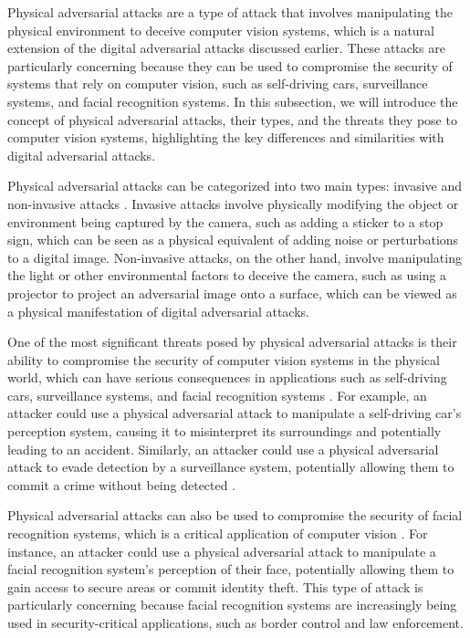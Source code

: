 \documentclass[11pt]{article}
\begin{document}
Physical adversarial attacks are a type of attack that involves manipulating the physical environment to deceive computer vision systems, which is a natural extension of the digital adversarial attacks discussed earlier. These attacks are particularly concerning because they can be used to compromise the security of systems that rely on computer vision, such as self-driving cars, surveillance systems, and facial recognition systems. In this subsection, we will introduce the concept of physical adversarial attacks, their types, and the threats they pose to computer vision systems, highlighting the key differences and similarities with digital adversarial attacks.

Physical adversarial attacks can be categorized into two main types: invasive and non-invasive attacks \cite{ref63}. Invasive attacks involve physically modifying the object or environment being captured by the camera, such as adding a sticker to a stop sign, which can be seen as a physical equivalent of adding noise or perturbations to a digital image. Non-invasive attacks, on the other hand, involve manipulating the light or other environmental factors to deceive the camera, such as using a projector to project an adversarial image onto a surface, which can be viewed as a physical manifestation of digital adversarial attacks.

One of the most significant threats posed by physical adversarial attacks is their ability to compromise the security of computer vision systems in the physical world, which can have serious consequences in applications such as self-driving cars, surveillance systems, and facial recognition systems \cite{ref5}. For example, an attacker could use a physical adversarial attack to manipulate a self-driving car's perception system, causing it to misinterpret its surroundings and potentially leading to an accident. Similarly, an attacker could use a physical adversarial attack to evade detection by a surveillance system, potentially allowing them to commit a crime without being detected \cite{ref11}.

Physical adversarial attacks can also be used to compromise the security of facial recognition systems, which is a critical application of computer vision \cite{ref32}. For instance, an attacker could use a physical adversarial attack to manipulate a facial recognition system's perception of their face, potentially allowing them to gain access to secure areas or commit identity theft. This type of attack is particularly concerning because facial recognition systems are increasingly being used in security-critical applications, such as border control and law enforcement.
\end{document}
